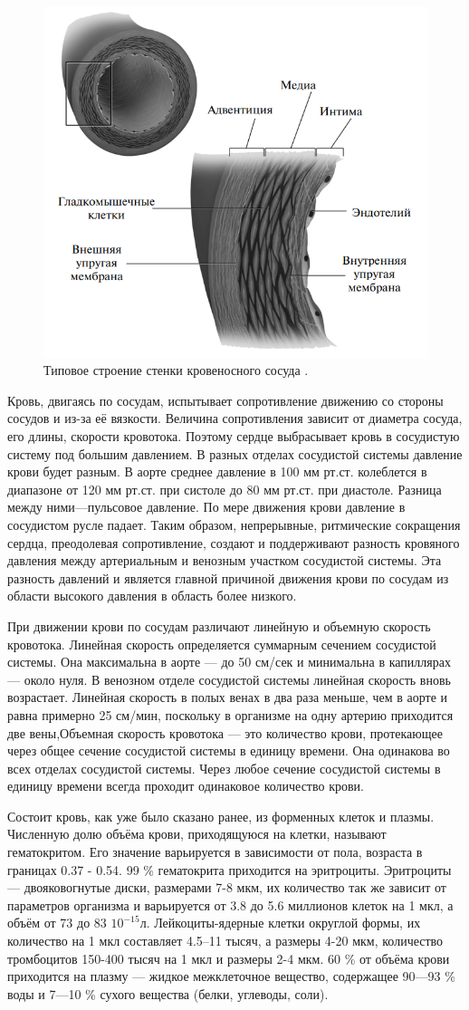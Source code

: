 \begin{figure}[h]
\centering
\includegraphics[width=0.3\linewidth]{stenki.png}
\caption{ Типовое строение стенки кровеносного сосуда \cite{blausen:2014}.}
\label{fig:mpr}
\end{figure}

Кровь, двигаясь по сосудам, испытывает сопротивление движению со стороны сосудов и из-за её вязкости. Величина сопротивления зависит от диаметра сосуда, его длины, скорости кровотока. Поэтому сердце выбрасывает кровь в сосудистую систему под большим давлением. В разных отделах сосудистой системы давление крови будет разным. В аорте среднее давление в 100 мм рт.ст. колеблется в диапазоне от 120 мм рт.ст. при систоле до 80 мм рт.ст. при диастоле. Разница между ними—пульсовое давление. По мере движения крови давление в сосудистом русле падает. Таким образом, непрерывные, ритмические сокращения сердца, преодолевая сопротивление, создают и поддерживают разность кровяного давления между артериальным и венозным участком сосудистой системы. Эта разность давлений и является главной причиной движения крови по сосудам из области высокого давления в область более низкого.

При движении крови по сосудам различают линейную и объемную скорость кровотока. Линейная скорость определяется суммарным сечением сосудистой системы. Она максимальна в аорте — до 50 см/сек и минимальна в капиллярах — около нуля. В венозном отделе сосудистой системы линейная скорость вновь возрастает. Линейная скорость в полых венах в два раза меньше, чем в аорте и равна примерно 25 см/мин, поскольку в организме на одну артерию приходится две вены,Объемная скорость кровотока — это количество крови, протекающее через общее сечение сосудистой системы в единицу времени. Она одинакова во всех отделах сосудистой системы. Через любое сечение сосудистой системы в единицу времени всегда проходит одинаковое количество крови.

Состоит кровь, как уже было сказано ранее, из форменных клеток и плазмы. Численную долю объёма крови, приходящуюся на клетки, называют гематокритом. Его значение варьируется в зависимости от пола, возраста в границах 0.37 - 0.54. 99 \% гематокрита приходится на эритроциты. Эритроциты— двояковогнутые диски, размерами 7-8 мкм, их количество так же зависит от параметров организма и варьируется от 3.8 до 5.6 миллионов клеток на 1 мкл, а объём от 73 до 83 $10^{-15}$л. Лейкоциты-ядерные клетки округлой формы, их количество на 1 мкл составляет 4.5–11 тысяч, а размеры 4-20 мкм, количество тромбоцитов 150-400 тысяч на 1 мкл и размеры 2-4 мкм. 60 \% от объёма крови приходится на плазму — жидкое межклеточное вещество, содержащее 90—93 \% воды и 7—10 \% сухого вещества (белки, углеводы, соли).

